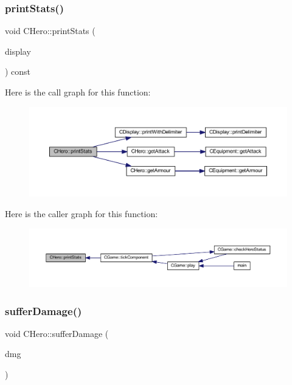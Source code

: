 \subsubsection{\texorpdfstring{print\+Stats()}{printStats()}}
{\footnotesize\ttfamily void C\+Hero\+::print\+Stats (\begin{DoxyParamCaption}\item[{const \mbox{\hyperlink{class_c_display}{C\+Display}} \&}]{display }\end{DoxyParamCaption}) const}

Here is the call graph for this function\+:\nopagebreak
\begin{figure}[H]
\begin{center}
\leavevmode
\includegraphics[width=350pt]{class_c_hero_a0232f04b4e49227ba90a8922135d4102_cgraph}
\end{center}
\end{figure}
Here is the caller graph for this function\+:\nopagebreak
\begin{figure}[H]
\begin{center}
\leavevmode
\includegraphics[width=350pt]{class_c_hero_a0232f04b4e49227ba90a8922135d4102_icgraph}
\end{center}
\end{figure}
\mbox{\label{class_c_hero_a9442ae76d634a968c99d6bc77c927f96}} 
\subsubsection{\texorpdfstring{suffer\+Damage()}{sufferDamage()}}
{\footnotesize\ttfamily void C\+Hero\+::suffer\+Damage (\begin{DoxyParamCaption}\item[{int}]{dmg }\end{DoxyParamCaption})\hspace{0.3cm}{\ttfamily [inline]}}

